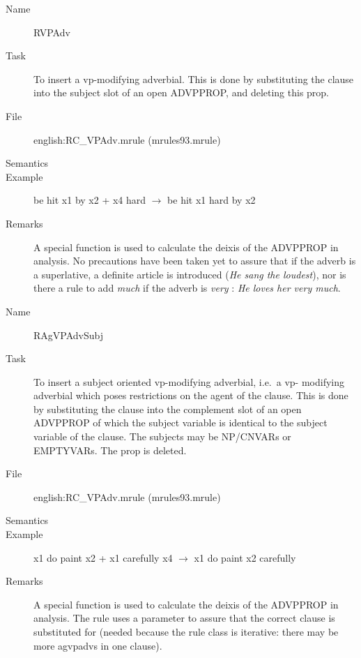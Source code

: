 \begin{description}
\vspace{1 cm}
\begin{description}
\item[Name] RVPAdv
\item[Task] To insert a vp-modifying adverbial. This is done by 
substituting the clause into the subject slot of an open ADVPPROP, and deleting 
this prop. 
\item[File] english:RC\_VPAdv.mrule (mrules93.mrule)
\item[Semantics]
\item[Example] be hit x1 by x2 + x4 hard $\rightarrow$ be hit x1 hard by x2
\item[Remarks] A special function is used to calculate the deixis of the 
ADVPPROP in analysis. No precautions have been taken yet to assure that if the 
adverb is a superlative, a definite article is introduced ({\em He sang the 
loudest\/}), nor is there a rule to add {\em much\/} if the adverb is {\em very
\/}: {\em He loves her very much\/}.
\end{description}

\vspace{1 cm}
\begin{description}
\item[Name] RAgVPAdvSubj
\item[Task] To insert a subject oriented vp-modifying adverbial, i.e.\ a vp-
modifying adverbial which poses restrictions on the agent of the clause.
This is done by 
substituting the clause into the complement slot of an open ADVPPROP of which 
the subject variable is identical to the subject variable of the clause.
The subjects may be NP/CNVARs or EMPTYVARs. The prop is deleted. 
\item[File] english:RC\_VPAdv.mrule (mrules93.mrule)
\item[Semantics]
\item[Example] x1 do paint x2 + x1 carefully x4 $\rightarrow$ x1 do paint x2 
carefully
\item[Remarks] A special function is used to calculate the deixis of the 
ADVPPROP in analysis. The rule uses a parameter to assure that the correct 
clause is substituted for (needed because the rule class is iterative: there 
may be more agvpadvs in one clause).
\end{description}


\end{description}
